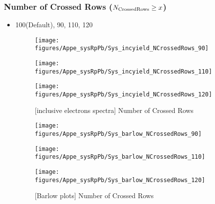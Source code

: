  
 \subsubsection{Number of Crossed Rows ($N_{\rm{CrossedRows}} \geq x$)}
\label{subsub:appe_sys_RpPb_NCrossedRows}

 \begin{itemize}
      \item 100(Default), 90, 110, 120
      
            \begin{figure}[H]
      	\begin{minipage}{0.33\hsize} 
      	\begin{center}
      	\texttt{[image: figures/Appe\_sysRpPb/Sys\_incyield\_NCrossedRows\_90]}
      	\end{center}
      	\end{minipage}
      	\begin{minipage}{0.33\hsize} 
      	\begin{center}
      	\texttt{[image: figures/Appe\_sysRpPb/Sys\_incyield\_NCrossedRows\_110]}
      	\end{center}
      	\end{minipage}
      	\begin{minipage}{0.33\hsize} 
      	\begin{center}
      	\texttt{[image: figures/Appe\_sysRpPb/Sys\_incyield\_NCrossedRows\_120]}
      	\end{center}
      	\end{minipage}
      \caption{[inclusive electrons spectra] Number of Crossed Rows}
      \label{fig:Sys_TPCNclust}
      \end{figure}
      
      \begin{figure}[H]
      	\begin{minipage}{0.33\hsize} 
      	\begin{center}
      	\texttt{[image: figures/Appe\_sysRpPb/Sys\_barlow\_NCrossedRows\_90]}
      	\end{center}
      	\end{minipage}
      	\begin{minipage}{0.33\hsize} 
      	\begin{center}
      	\texttt{[image: figures/Appe\_sysRpPb/Sys\_barlow\_NCrossedRows\_110]}
      	\end{center}
      	\end{minipage}
      	\begin{minipage}{0.33\hsize} 
      	\begin{center}
      	\texttt{[image: figures/Appe\_sysRpPb/Sys\_barlow\_NCrossedRows\_120]}
      	\end{center}
      	\end{minipage}
      \caption{[Barlow plots] Number of Crossed Rows}
      \label{fig:Sys_TPCNclust}
      \end{figure}
      
 \end{itemize}


